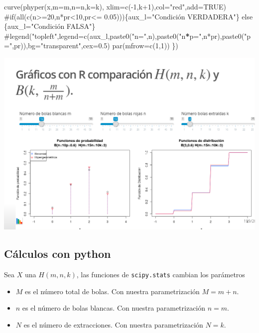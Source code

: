 \documentclass[]{book}
\newenvironment{Shaded}{\begin{snugshade}}{\end{snugshade}}
\newcommand{\DataTypeTok}[1]{\textcolor[rgb]{0.13,0.29,0.53}{#1}}
\newcommand{\NormalTok}[1]{#1}
\newcommand{\OperatorTok}[1]{\textcolor[rgb]{0.81,0.36,0.00}{\textbf{#1}}}
\newcommand{\StringTok}[1]{\textcolor[rgb]{0.31,0.60,0.02}{#1}}
\providecommand{\tightlist}{%
  \setlength{\itemsep}{0pt}\setlength{\parskip}{0pt}}
\begin{document}
\begin{Shaded}
\begin{Highlighting}[]
\StringTok{  curve(phyper(x,m=m,n=n,k=k),}
\StringTok{        xlim=c(-1,k+1),col="}\NormalTok{red}\StringTok{",add=TRUE)}
\StringTok{  #if(all(c(n>=20,n*pr<10,pr<= 0.05)))\{aux_l="}\NormalTok{Condición VERDADERA}\StringTok{"\} else \{aux_l="}\NormalTok{Condición FALSA}\StringTok{"\}}
\StringTok{  #legend("}\NormalTok{topleft}\StringTok{",legend=c(aux_l,paste0("}\DataTypeTok{n=}\StringTok{",n),paste0("}\NormalTok{n}\OperatorTok{*}\DataTypeTok{p=}\StringTok{",n*pr),paste0("}\DataTypeTok{p=}\StringTok{",pr)),bg="}\NormalTok{transparent}\StringTok{",cex=0.5)}
\StringTok{  par(mfrow=c(1,1))}
\StringTok{\})}
\end{Highlighting}
\end{Shaded}

\href{https://github.com/joanby/probabilidad}{\includegraphics{Images/noshinyImages/interactivos_hipergeom_binom1.png}}

\hypertarget{cuxe1lculos-con-python-11}{%
\subsection{Cálculos con python}\label{cuxe1lculos-con-python-11}}

Sea \(X\) una \(H(m,n,k)\), las funciones de \texttt{scipy.stats} cambian los parámetros

\begin{itemize}
\tightlist
\item
  \(M\) es el número total de bolas. Con nuestra parametrización \(M=m+n\).
\item
  \(n\) es el número de bolas blancas. Con nuestra parametrización \(n=m\).
\item
  \(N\) es el número de extracciones. Con nuestra parametrización \(N=k\).
\end{itemize}
\end{document}
